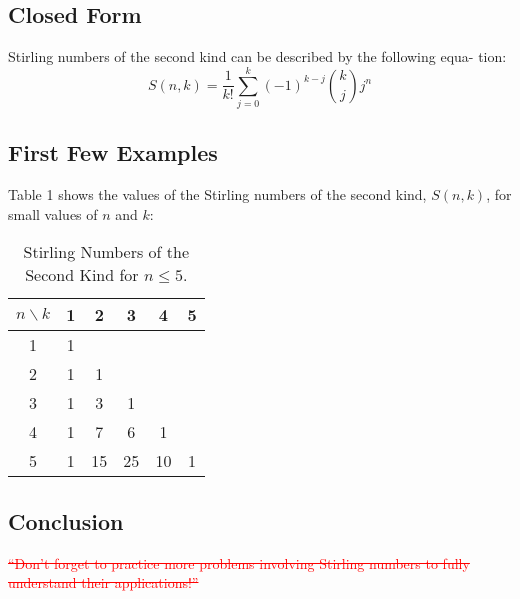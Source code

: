 \documentclass{article}
\begin{document}
\subsection{Closed Form}
Stirling numbers of the second kind can be described by the following equa-
tion:
\begin{equation*}
    S(n, k) = \frac{1}{k!} \sum_{j=0}^{k} (-1)^{k-j} \binom{k}{j} j^n
\end{equation*}

\subsection{First Few Examples}
Table 1 shows the values of the Stirling numbers of the second kind, $S(n, k)$,
for small values of $n$ and $k$:

\begin{table}[htbp]
    \centering
    \begin{tabular}{|c|c|c|c|c|c|}
        \hline
        $n \backslash k$ & 1 & 2 & 3 & 4 & 5 \\
        \hline
        1 & 1 &  &  &  &  \\
        2 & 1 & 1 &  &  &  \\
        3 & 1 & 3 & 1 &  &  \\
        4 & 1 & 7 & 6 & 1 &  \\
        5 & 1 & 15 & 25 & 10 & 1 \\
        \hline
    \end{tabular}
    \caption{Stirling Numbers of the Second Kind for $n \leq 5$.}
\end{table}

\subsection{Conclusion}
\textcolor{red}{\sout{“Don’t forget to practice more problems involving Stirling numbers to fully
understand their applications!”}}

\printbibliography
\end{document}
